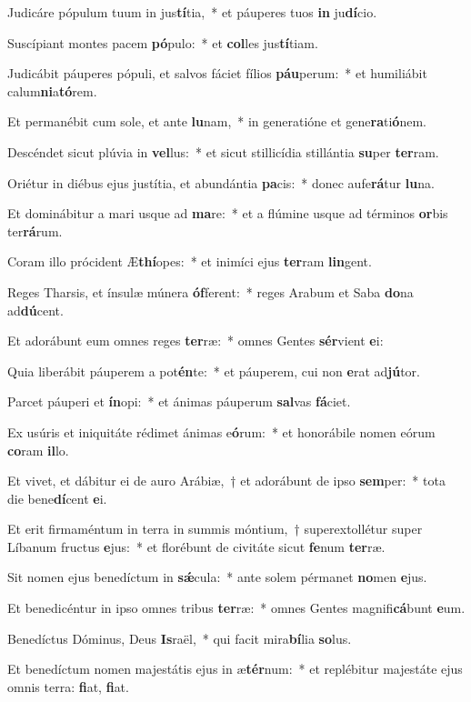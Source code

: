\item Judicáre pópulum tuum in jus\textbf{tí}tia,~* et páuperes tuos \textbf{in} ju\textbf{dí}cio.
\item Suscípiant montes pacem \textbf{pó}pulo:~* et \textbf{col}les jus\textbf{tí}tiam.
\item Judicábit páuperes pópuli, et salvos fáciet fílios \textbf{páu}perum:~* et humiliábit calum\textbf{ni}a\textbf{tó}rem.
\item Et permanébit cum sole, et ante \textbf{lu}nam,~* in generatióne et gene\textbf{ra}ti\textbf{ó}nem.
\item Descéndet sicut plúvia in \textbf{vel}lus:~* et sicut stillicídia stillántia \textbf{su}per \textbf{ter}ram.
\item Oriétur in diébus ejus justítia, et abundántia \textbf{pa}cis:~* donec aufe\textbf{rá}tur \textbf{lu}na.
\item Et dominábitur a mari usque ad \textbf{ma}re:~* et a flúmine usque ad términos \textbf{or}bis ter\textbf{rá}rum.
\item Coram illo prócident Æ\textbf{thí}opes:~* et inimíci ejus \textbf{ter}ram \textbf{lin}gent.
\item Reges Tharsis, et ínsulæ múnera \textbf{óf}ferent:~* reges Arabum et Saba \textbf{do}na ad\textbf{dú}cent.
\item Et adorábunt eum omnes reges \textbf{ter}ræ:~* omnes Gentes \textbf{sér}vient \textbf{e}i:
\item Quia liberábit páuperem a pot\textbf{én}te:~* et páuperem, cui non \textbf{e}rat ad\textbf{jú}tor.
\item Parcet páuperi et \textbf{ín}opi:~* et ánimas páuperum \textbf{sal}vas \textbf{fá}ciet.
\item Ex usúris et iniquitáte rédimet ánimas e\textbf{ó}rum:~* et honorábile nomen eórum \textbf{co}ram \textbf{il}lo.
\item Et vivet, et dábitur ei de auro Arábiæ,~† et adorábunt de ipso \textbf{sem}per:~* tota die bene\textbf{dí}cent \textbf{e}i.
\item Et erit firmaméntum in terra in summis móntium,~† superextollétur super Líbanum fructus \textbf{e}jus:~* et florébunt de civitáte sicut \textbf{fe}num \textbf{ter}ræ.
\item Sit nomen ejus benedíctum in \textbf{sǽ}cula:~* ante solem pérmanet \textbf{no}men \textbf{e}jus.
\item Et benedicéntur in ipso omnes tribus \textbf{ter}ræ:~* omnes Gentes magnifi\textbf{cá}bunt \textbf{e}um.
\item Benedíctus Dóminus, Deus \textbf{Is}raël,~* qui facit mira\textbf{bí}lia \textbf{so}lus.
\item Et benedíctum nomen majestátis ejus in æ\textbf{tér}num:~* et replébitur majestáte ejus omnis terra: \textbf{fi}at, \textbf{fi}at.
